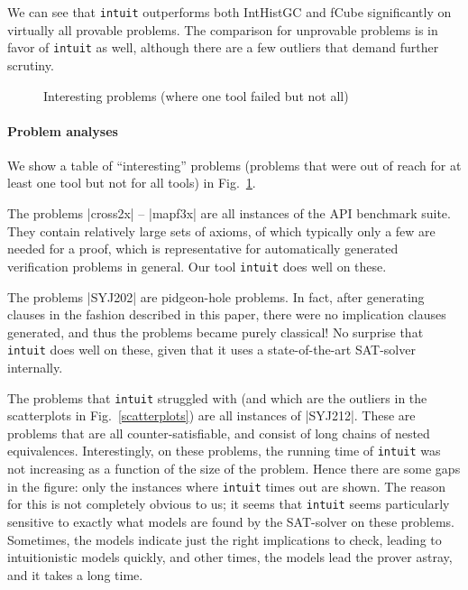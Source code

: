 \documentclass{llncs}
\begin{document}
We can see that {\tt intuit} outperforms both IntHistGC and fCube significantly on virtually all provable problems. The comparison for unprovable problems is in favor of {\tt intuit} as well, although there are a few outliers that demand further scrutiny.

\begin{figure}[htd]
\centering

\caption{
Interesting problems (where one tool failed but not all)
\label{fig:interesting}
}
\end{figure}

\paragraph{Problem analyses}
We show a table of ``interesting'' problems (problems that were out of reach for at least one tool but not for all tools) in Fig.\ \ref{fig:interesting}.

The problems |cross2x| -- |mapf3x| are all instances of the API benchmark suite. They contain relatively large sets of axioms, of which typically only a few are needed for a proof, which is representative for automatically generated verification problems in general. Our tool {\tt intuit} does well on these.

The problems |SYJ202| are pidgeon-hole problems. In fact, after generating clauses in the fashion described in this paper, there were no implication clauses generated, and thus the problems became purely classical! No surprise that {\tt intuit} does well on these, given that it uses a state-of-the-art SAT-solver internally.

The problems that {\tt intuit} struggled with (and which are the outliers in the scatterplots in Fig.\ \ref{scatterplots}) are all instances of |SYJ212|. These are problems that are all counter-satisfiable, and consist of long chains of nested equivalences.
Interestingly, on these problems, the running time of {\tt intuit} was not
increasing as a function of the size of the problem. Hence there are some gaps in the figure: only the instances where {\tt intuit} times out are shown. The reason for this is not completely obvious to us; it seems that {\tt intuit} seems particularly sensitive to exactly what models are found by the SAT-solver on these problems. Sometimes, the models indicate just the right implications to check, leading to intuitionistic models quickly, and other times, the models lead the prover astray, and it takes a long time. 

\end{document}
